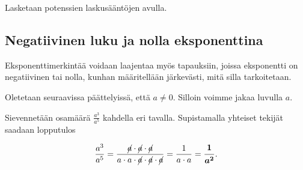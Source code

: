  
    \begin{esimerkki}
        Lasketaan potenssien laskusääntöjen avulla.
        \begin{alakohdat}
         \end{alakohdat}
    \end{esimerkki} 
 
\subsection*{Negatiivinen luku ja nolla eksponenttina}

Eksponenttimerkintää voidaan laajentaa myös tapauksiin, joissa eksponentti on negatiivinen tai nolla, kunhan määritellään järkevästi, mitä silla tarkoitetaan.

Oletetaan seuraavissa päättelyissä, että $a \neq 0$. Silloin voimme jakaa luvulla $a$.
    
Sievennetään osamäärä $\frac{a^3}{a^5}$ kahdella eri tavalla. Supistamalla yhteiset tekijät saadaan lopputulos
    
    \begin{equation*}
        \frac{a^3}{a^5} =
        \frac{\cancel{a}\cdot \cancel{a}\cdot \cancel{a}}{a\cdot a\cdot
        \cancel{a}\cdot \cancel{a}\cdot \cancel{a}} = 
        \frac{1}{a\cdot a}=\boldsymbol{\frac{1}{a^2}}.
    \end{equation*}
    
